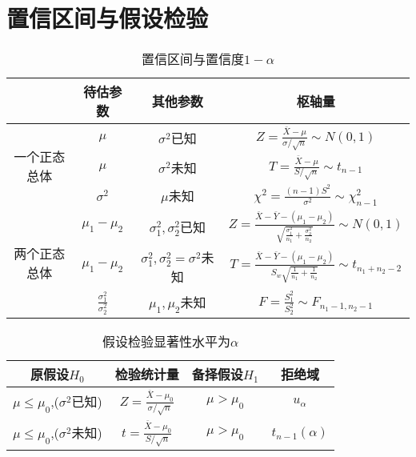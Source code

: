 \documentclass{article}
\begin{document}
\section{置信区间与假设检验}
\begin{table}[H]
	\centering
	\renewcommand\arraystretch{2.5}
	\begin{tabular}{c|c|c|c}\hline
		  & 待估参数 & 其他参数 & 枢轴量 \\ \hline
		\multirow{3}{*}{一个正态总体} & $\mu$ & $\sigma^2$已知 & $\displaystyle Z=\frac{\overline{X}-\mu}{\sigma/\sqrt{n}}\sim N(0,1)$ \\
		& $\mu$ & $\sigma^2$未知 & $\displaystyle T=\frac{\overline{X}-\mu}{S/\sqrt{n}}\sim t_{n-1}$ \\
		& $\sigma^2$ & $\mu$未知 & $\displaystyle \chi^2=\frac{(n-1)S^2}{\sigma^2}\sim \chi^2_{n-1}$ \\ \hline
		\multirow{3}{*}{两个正态总体} & $\mu_1-\mu_2$ & $\sigma_1^2,\sigma_2^2$已知 & $\displaystyle Z=\frac{\overline{X}-\overline{Y}-(\mu_1-\mu_2)}{\sqrt{\frac{\sigma_1^2}{n_1}+\frac{\sigma_2^2}{n_2}}}\sim N(0,1)$ \\
		& $\mu_1-\mu_2$ & $\sigma_1^2,\sigma_2^2=\sigma^2$未知 & $\displaystyle T=\frac{\overline{X}-\overline{Y}-(\mu_1-\mu_2)}{S_w\sqrt{\frac{1}{n_1}+\frac{1}{n_2}}}\sim t_{n_1+n_2-2}$ \\
		& $\frac{\sigma_1^2}{\sigma_2^2}$ & $\mu_1,\mu_2$未知 & $\displaystyle F=\frac{S_1^2}{S_2^2}\sim F_{n_1-1,n_2-1}$ \\ \hline
	\end{tabular}
	\caption{置信区间与置信度$1-\alpha$}
\end{table}

\begin{table}[H]
	\centering
	\renewcommand\arraystretch{2.5}
	\begin{tabular}{c|c|c|c}\hline
		原假设$H_0$ & 检验统计量 & 备择假设$H_1$ & 拒绝域 \\ \hline
		$\mu \leq \mu_0$,($\sigma^2$已知) & $\displaystyle Z=\frac{\overline{X}-\mu_0}{\sigma/\sqrt{n}}$ & $\mu>\mu_0$ & $u_{\alpha}$\\
		$\mu \leq \mu_0$,($\sigma^2$未知) & $\displaystyle t=\frac{\overline{X}-\mu_0}{S/\sqrt{n}}$ & $\mu>\mu_0$ & $t_{n-1}(\alpha)$
	\end{tabular}
	\caption{假设检验显著性水平为$\alpha$}
\end{table}
\end{document}
